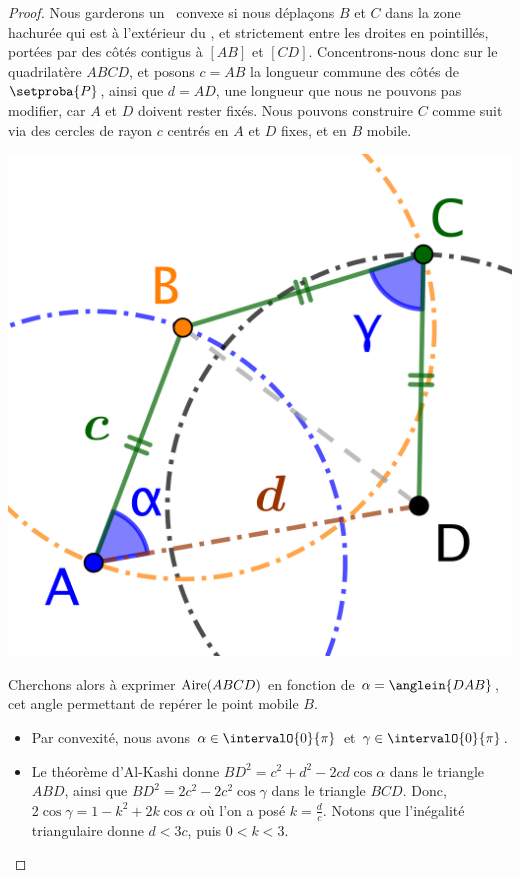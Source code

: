 \begin{proof}
	Nous garderons un \ngone\ convexe si nous déplaçons $B$ et $C$ dans la zone hachurée qui est à l'extérieur du \ngone, et strictement entre les droites en pointillés, portées par des côtés contigus à $[AB]$ et $[CD]$.
	Concentrons-nous donc sur le quadrilatère $ABCD$, et posons $c = AB$ la longueur commune des côtés de $\setproba{P}$, ainsi que $d = AD$, une longueur que nous ne pouvons pas modifier, car $A$ et $D$ doivent rester fixés.
	Nous pouvons construire $C$ comme suit via des cercles de rayon $c$ centrés en $A$ et $D$ fixes, et en $B$ mobile.
	\begin{center}
		\includegraphics[scale=.35]{content/polygon/sol-must-be/2-eq-angles-circle.png}
	\end{center}

	Cherchons alors à exprimer $\mathrm{Aire}(ABCD)$ en fonction de $\alpha = \anglein{DAB}$, cet angle permettant de repérer le point mobile $B$.
	\begin{itemize}
	    \item Par convexité, nous avons $\alpha \in \intervalO{0}{\pi}$ et $\gamma \in \intervalO{0}{\pi}$.


	    \item Le théorème d'Al-Kashi donne
	    $BD^2 = c^2 + d^2 - 2 c d \cos \alpha$ dans le triangle $ABD$,
	    ainsi que
	    $BD^2 = 2 c^2 - 2 c^2 \cos \gamma$ dans le triangle $BCD$.
	    Donc,
	    $2 \cos \gamma = 1 - k^2 + 2 k \cos \alpha$ où l'on a posé $k = \frac{d}{c}$.
	    Notons que l'inégalité triangulaire donne $d < 3 c$, puis $0 < k < 3$.



\end{itemize}
\end{proof}
